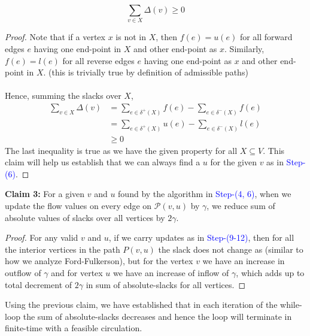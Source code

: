 \documentclass{article}
\newcommand{\stepNumber}[1]{\textcolor{blue}{Step-(#1)}}
\begin{document}
        \begin{equation*}
            \sum_{v \in X} \Delta(v) \ge 0 
        \end{equation*}
        \begin{proof}
            Note that if a vertex $x$ is not in $X$, then $f(e) = u(e)$ for all forward edges $e$ having one end-point in $X$ and other end-point as $x$. Similarly, $f(e) = l(e)$ for all reverse edges $e$ having one end-point as $x$ and other end-point in $X$. (this is trivially true by definition of admissible paths)\\\\
            Hence, summing the slacks over $X$, 
            \begin{equation*}
                \begin{split}
                    \sum_{v \in X} \Delta(v) &= \sum_{e \in \delta^+(X)} f(e) - \sum_{e \in \delta^-(X)} f(e)\\
                    &= \sum_{e \in \delta^+(X)} u(e) - \sum_{e \in \delta^-(X)} l(e)\\
                    &\ge 0 
                \end{split}
            \end{equation*}
            The last inequality is true as we have the given property for all $X\subseteq V$. This claim will help us establish that we can always find a $u$ for the given $v$ as in \stepNumber{6}. 
        \end{proof}
        \noindent \textbf{Claim 3:} For a given $v$ and $u$ found by the algorithm in \stepNumber{4, 6}, when we update the flow values on every edge on $\mathcal{P}(v, u)$ by $\gamma$, we reduce sum of absolute values of slacks over all vertices by $2\gamma$. 
        \begin{proof}
            For any valid $v$ and $u$, if we carry updates as in \stepNumber{9-12}, then for all the interior vertices in the path $P(v, u)$ the slack does not change as (similar to how we analyze Ford-Fulkerson), but for the vertex $v$ we have an increase in outflow of $\gamma$ and for vertex $u$ we have an increase of inflow of $\gamma$, which adds up to total decrement of $2\gamma$ in sum of absolute-slacks for all vertices. 
        \end{proof}
        \noindent Using the previous claim, we have established that in each iteration of the while-loop the sum of absolute-slacks decreases and hence the loop will terminate in finite-time with a feasible circulation. 
\end{document}
